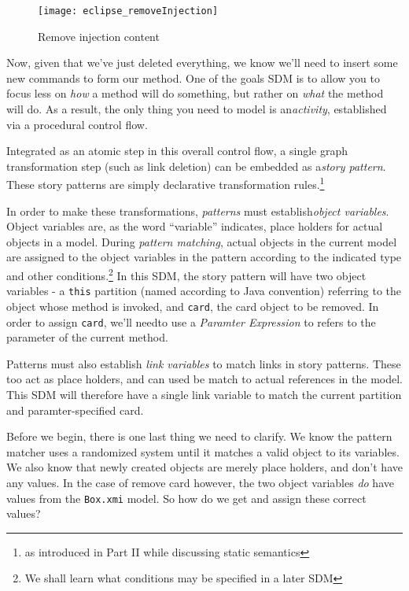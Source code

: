 \newpage

\begin{figure}[htbp]
	\centering
    \texttt{[image: eclipse\_removeInjection]}
	\caption{Remove injection content}
	\label{fig:delete_injection}
\end{figure}

\vspace{1cm}

Now, given that we've just deleted everything, we know we'll need to insert some new commands to form our method. One of the goals SDM is to allow you to
focus less on \emph{how} a method will do something, but rather on \emph{what} the method will do. As a result, the only thing you need to model is
an\emph{activity}, established via a procedural control flow. 

Integrated as an atomic step in this overall control flow, a single graph transformation step (such as link deletion) can be embedded as
a\emph{story pattern}. These story patterns are simply declarative transformation rules.\footnote{as introduced in Part II while
discussing static semantics}

In order to make these transformations, \emph{patterns} must establish\emph{object variables}. Object variables are, as
the word ``variable'' indicates, place holders for actual objects in a model.  During \emph{pattern matching}, actual objects in the 
current model are assigned to the object variables in the pattern according to the indicated type and other conditions.\footnote{We shall
learn what conditions may be specified in a later SDM} In this SDM, the story pattern will have two object variables - a \texttt{this} partition (named
according to Java convention) referring to the object whose method is invoked, and \texttt{card}, the card object to be removed. In order to assign
\texttt{card}, we'll needto use a \emph{Paramter Expression} to refers to the parameter of the current method.

Patterns must also establish \emph{link variables} to match links in story patterns. These too act as place holders, and
can used be match to actual references in the model. This SDM will therefore have a single link variable to match the current partition and paramter-specified
card.

Before we begin, there is one last thing we need to clarify. We know the pattern matcher uses a randomized system until it matches a valid object to its
variables. We also know that newly created objects are merely place holders, and don't have any values. In the case of remove card however, the two object
variables \emph{do} have values from the \texttt{Box.xmi} model. So how do we get and assign these correct values?

